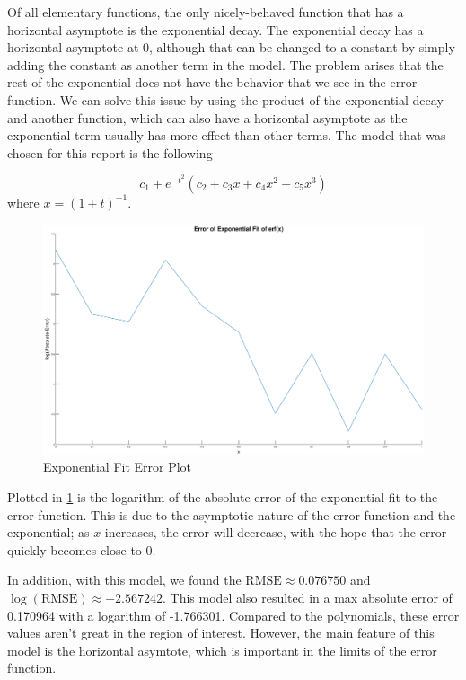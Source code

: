 \documentclass[10pt,a4paper]{article}
\begin{document}
Of all elementary functions, the only nicely-behaved function that has a horizontal asymptote is the exponential decay. The exponential decay has a horizontal asymptote at $0$, although that can be changed to a constant by simply adding the constant as another term in the model. The problem arises that the rest of the exponential does not have the behavior that we see in the error function. We can solve this issue by using the product of the exponential decay and another function, which can also have a horizontal asymptote as the exponential term usually has more effect than other terms. The model that was chosen for this report is the following

\begin{equation}
c_1 + e^{-t^2} \left( c_2 + c_3 x + c_4 x^2 + c_5 x^3 \right)
\label{eqn: exponential model}
\end{equation}
where $x = \left( 1 + t \right)^{-1}$.

\begin{figure}[H]
\includegraphics[width=\linewidth]{Figures/experror.eps}
\caption{Exponential Fit Error Plot}
\label{fig: experrors}
\end{figure}

Plotted in \cref{fig: experrors} is the logarithm of the absolute error of the exponential fit to the error function. This is due to the asymptotic nature of the error function and the exponential; as $x$ increases, the error will decrease, with the hope that the error quickly becomes close to 0.

In addition, with this model, we found  the $\text{RMSE} \approx 0.076750$ and $\log{(\text{RMSE})} \approx -2.567242$. This model also resulted in a max absolute error of 0.170964 with a logarithm of -1.766301. Compared to the polynomials, these error values aren't great in the region of interest. However, the main feature of this model is the horizontal asymtote, which is important in the limits of the error function.
\end{document}
